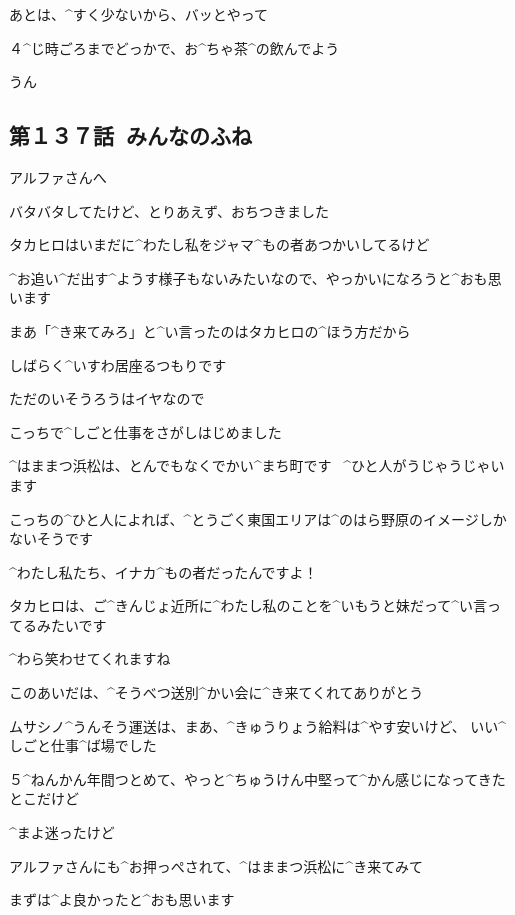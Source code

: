 \Shiba あとは、^{すく}{少}ないから、バッとやって

\Shiba ４^{じ}{時}ごろまでどっかで、お^{ちゃ}{茶}^{の}{飲}んでよう

\Kokone うん


\subsection{第１３７話\ みんなのふね}

\page[92]
\Makki アルファさんへ

\page[93]
\Makki バタバタしてたけど、とりあえず、おちつきました

\Makki タカヒロはいまだに^{わたし}{私}をジャマ^{もの}{者}あつかいしてるけど

\Makki ^{お}{追}い^{だ}{出}す^{ようす}{様子}もないみたいなので、やっかいになろうと^{おも}{思}います

\page[94]
\Makki まあ「^{き}{来}てみろ」と^{い}{言}ったのはタカヒロの^{ほう}{方}だから

\Makki しばらく^{いすわ}{居座}るつもりです

\Makki ただのいそうろうはイヤなので

\Makki こっちで^{しごと}{仕事}をさがしはじめました

\page[95]
\Makki ^{はままつ}{浜松}は、とんでもなくでかい^{まち}{町}です
\ ^{ひと}{人}がうじゃうじゃいます

\Makki こっちの^{ひと}{人}によれば、^{とうごく}{東国}エリアは^{のはら}{野原}のイメージしかないそうです

\Makki ^{わたし}{私}たち、イナカ^{もの}{者}だったんですよ！

\page[96]
\Makki タカヒロは、ご^{きんじょ}{近所}に^{わたし}{私}のことを^{いもうと}{妹}だって^{い}{言}ってるみたいです

\Makki ^{わら}{笑}わせてくれますね

\page[97]
\Makki このあいだは、^{そうべつ}{送別}^{かい}{会}に^{き}{来}てくれてありがとう

\Makki ムサシノ^{うんそう}{運送}は、まあ、^{きゅうりょう}{給料}は^{やす}{安}いけど、
いい^{しごと}{仕事}^{ば}{場}でした

\Makki ５^{ねんかん}{年間}つとめて、やっと^{ちゅうけん}{中堅}って^{かん}{感}じになってきたとこだけど

\Makki ^{まよ}{迷}ったけど

\page[98]
\Makki アルファさんにも^{お}{押}っぺされて、^{はままつ}{浜松}に^{き}{来}てみて

\Makki まずは^{よ}{良}かったと^{おも}{思}います

